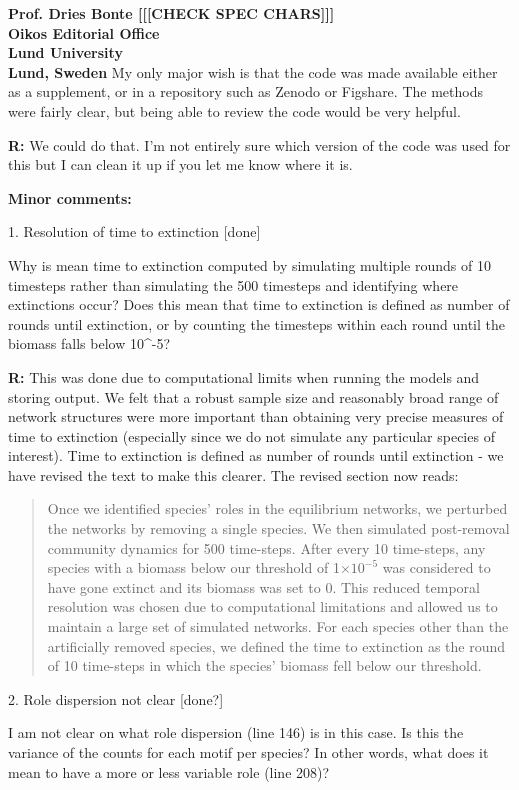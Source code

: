 \documentclass[12pt]{letter}
\begin{document}
\begin{letter}{\bf Prof. Dries Bonte [[[CHECK SPEC CHARS]]]\\
Oikos Editorial Office \\
Lund University \\
Lund, Sweden}
  My only major wish is that the code was made available either as a supplement, or in a repository such as Zenodo or Figshare. The methods were fairly clear, but being able to review the code would be very helpful.


  \textbf{R:}  
  We could do that. I'm not entirely sure which version of the code was used for this but I can clean it up if you let me know where it is.


  \textbf{Minor comments:}

  1. Resolution of time to extinction [done]


    Why is mean time to extinction computed by simulating multiple rounds of 10 timesteps rather than simulating the 500 timesteps and identifying where extinctions occur? Does this mean that time to extinction is defined as number of rounds until extinction, or by counting the timesteps within each round until the biomass falls below 10^-5? 

    \textbf{R:} This was done due to computational limits when running the models and storing output. We felt that a robust sample size and reasonably broad range of network structures were more important than obtaining very precise measures of time to extinction (especially since we do not simulate any particular species of interest). Time to extinction is defined as number of rounds until extinction - we have revised the text to make this clearer. The revised section now reads:

    \begin{quotation}

            Once we identified species' roles in the equilibrium networks, we perturbed the networks by removing a single species. 
            We then simulated post-removal community dynamics for 500 time-steps.
            After every 10 time-steps, any species with a biomass below our threshold of 1$\times10^{-5}$ was considered to have gone extinct and its biomass was set to 0.
            This reduced temporal resolution was chosen due to computational limitations and allowed us to maintain a large set of simulated networks.
            For each species other than the artificially removed species, we defined the time to extinction as the round of 10 time-steps in which the species' biomass fell below our threshold. 

    \end{quotation}


  2. Role dispersion not clear [done?]


    I am not clear on what role dispersion (line 146) is in this case. Is this the variance of the counts for each motif per species? In other words, what does it mean to have a more or less variable role (line 208)?


\end{letter}
\end{document}
